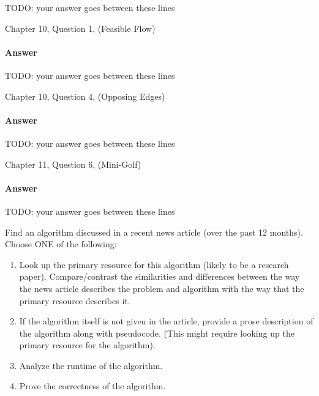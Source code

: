 \documentclass{article}
\begin{document}

TODO: your answer goes between these lines


\nextprob
{}

Chapter 10, Question 1, (Feasible Flow)

\paragraph{Answer}


TODO: your answer goes between these lines



\nextprob
{}

Chapter 10, Question 4, (Opposing Edges)

\paragraph{Answer}


TODO: your answer goes between these lines


\nextprob
{}

Chapter 11, Question 6, (Mini-Golf)

\paragraph{Answer}


TODO: your answer goes between these lines


\nextprob
{}

Find an algorithm discussed in a recent news article (over the past 12 months).
Choose ONE of the following:
\begin{enumerate}
    \item Look up the primary resource for this algorithm (likely to be a
        research paper).  Compare/contrast the similarities and differences between the
        way the news article describes the problem and algorithm with the way
        that the primary resource describes it.
    \item If the algorithm itself is not given in the article, provide a prose
        description of the algorithm along with pseudocode. (This might require
        looking up the primary resource for the algorithm).
    \item Analyze the runtime of the algorithm.
    \item Prove the correctness of the algorithm.
\end{enumerate}
\end{document}
